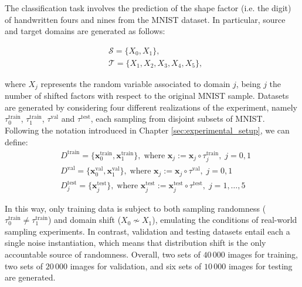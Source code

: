\begin{definition}\label{def:shifted_factors_experiment}
    The classification task involves the prediction of the shape factor (i.e. the digit)
    of handwritten fours and nines from the MNIST dataset. In particular, source and target
    domains are generated as follows:

    $$
    \begin{aligned}
        &\mathcal{S} = \{ X_0, X_1\},\\
        &\mathcal{T} = \{ X_1, X_2, X_3, X_4, X_5\},
    \end{aligned}
    $$

    where $X_j$ represents the random variable associated to domain $j$, 
    being $j$ the number of shifted factors with respect to the original MNIST sample. Datasets are generated by considering
    four different realizations of the experiment, namely $\tau_0^{\text{train}}$, $\tau_1^{\text{train}}$, $\tau^{\text{val}}$
    and $\tau^{\text{test}}$, each sampling from disjoint subsets of MNIST. Following the notation introduced
    in Chapter \ref{sec:experimental_setup}, we can define:
    $$
    \begin{aligned}
        &D^{\text{train}} = \{\bm{x}_0^{\text{train}}, \bm{x}_1^{\text{train}}\}, \; \text{where } \bm{x}_j := \bm{x}_j \circ \tau_j^{\text{train}}, \;j = 0,1 \\
        &D^{\text{val}} = \{\bm{x}_0^{\text{val}}, \bm{x}_1^{\text{val}}\}, \; \text{where } \bm{x}_j := \bm{x}_j \circ \tau^{\text{val}}, \;j=0,1 \\
        &D_j^{\text{test}} = \{\bm{x}_j^{\text{test}}\}, \; \text{where } \bm{x}_j^{\text{test}} := \bm{x}_j^{\text{test}} \circ \tau^{\text{test}}, \;j = 1,\dots,5
    \end{aligned}
    $$

    In this way, only training data is subject to both sampling randomness ($\tau_0^{\text{train}} \neq \tau_1^{\text{train}}$)
    and domain shift ($X_0 \nsim X_1$), emulating the conditions of real-world sampling experiments.
    In contrast, validation and testing datasets entail each a single noise instantiation, 
    which means that distribution shift is the only accountable source of randomness.
    Overall, two sets of $40\,000$ images for training, two sets of $20\,000$ 
    images for validation, and six sets of $10\,000$ images for testing are generated. 

\end{definition}

